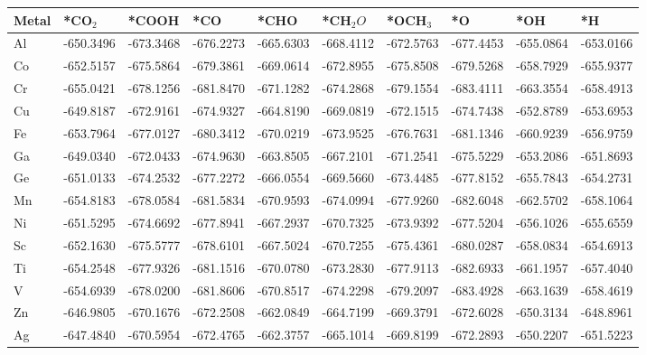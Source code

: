 \begin{table}[h]
  \centering
  {\fontsize{6}{12}\selectfont
  \begin{tabular}{*{10}{l}}
    \hline
    Metal & *CO$_2$ & *COOH    & *CO       & *CHO      & *CH$_2O$  & *OCH$_3$  & *O        & *OH       & *H        \\
    \hline
    Al & -650.3496 & -673.3468 & -676.2273 & -665.6303 & -668.4112 & -672.5763 & -677.4453 & -655.0864 & -653.0166 \\
    Co & -652.5157 & -675.5864 & -679.3861 & -669.0614 & -672.8955 & -675.8508 & -679.5268 & -658.7929 & -655.9377 \\
    Cr & -655.0421 & -678.1256 & -681.8470 & -671.1282 & -674.2868 & -679.1554 & -683.4111 & -663.3554 & -658.4913 \\
    Cu & -649.8187 & -672.9161 & -674.9327 & -664.8190 & -669.0819 & -672.1515 & -674.7438 & -652.8789 & -653.6953 \\
    Fe & -653.7964 & -677.0127 & -680.3412 & -670.0219 & -673.9525 & -676.7631 & -681.1346 & -660.9239 & -656.9759 \\
    Ga & -649.0340 & -672.0433 & -674.9630 & -663.8505 & -667.2101 & -671.2541 & -675.5229 & -653.2086 & -651.8693 \\
    Ge & -651.0133 & -674.2532 & -677.2272 & -666.0554 & -669.5660 & -673.4485 & -677.8152 & -655.7843 & -654.2731 \\
    Mn & -654.8183 & -678.0584 & -681.5834 & -670.9593 & -674.0994 & -677.9260 & -682.6048 & -662.5702 & -658.1064 \\
    Ni & -651.5295 & -674.6692 & -677.8941 & -667.2937 & -670.7325 & -673.9392 & -677.5204 & -656.1026 & -655.6559 \\
    Sc & -652.1630 & -675.5777 & -678.6101 & -667.5024 & -670.7255 & -675.4361 & -680.0287 & -658.0834 & -654.6913 \\
    Ti & -654.2548 & -677.9326 & -681.1516 & -670.0780 & -673.2830 & -677.9113 & -682.6933 & -661.1957 & -657.4040 \\
    V  & -654.6939 & -678.0200 & -681.8606 & -670.8517 & -674.2298 & -679.2097 & -683.4928 & -663.1639 & -658.4619 \\
    Zn & -646.9805 & -670.1676 & -672.2508 & -662.0849 & -664.7199 & -669.3791 & -672.6028 & -650.3134 & -648.8961 \\
    Ag & -647.4840 & -670.5954 & -672.4765 & -662.3757 & -665.1014 & -669.8199 & -672.2893 & -650.2207 & -651.5223 \\

\end{tabular}}
\end{table}

